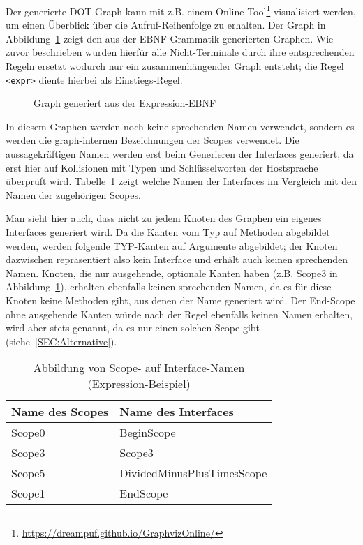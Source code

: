 \documentclass[../InterneDSLs.tex]{subfiles}
\begin{document}
Der generierte DOT-Graph kann mit z.B. einem Online-Tool\footnote{\url{https://dreampuf.github.io/GraphvizOnline/}} visualisiert werden, um einen Überblick über die Aufruf-Reihenfolge zu erhalten. Der Graph in Abbildung~\ref{FIG:ExprGraph} zeigt den aus der EBNF-Grammatik generierten Graphen. Wie zuvor beschrieben wurden hierfür alle Nicht-Terminale durch ihre entsprechenden Regeln ersetzt wodurch nur ein zusammenhängender Graph entsteht; die Regel \verb|<expr>| diente hierbei als Einstiegs-Regel.

\begin{figure}[ht]
\centering
\resizebox{\linewidth}{!}{}
\caption{Graph generiert aus der Expression-EBNF}
\label{FIG:ExprGraph}
\end{figure}

In diesem Graphen werden noch keine sprechenden Namen verwendet, sondern es werden die graph-internen Bezeichnungen der Scopes verwendet. Die aussagekräftigen Namen werden erst beim Generieren der Interfaces generiert, da erst hier auf Kollisionen mit Typen und Schlüsselworten der Hostsprache überprüft wird. Tabelle~\ref{TAB:MappingExpressionScopeToInterface} zeigt welche Namen der Interfaces im Vergleich mit den Namen der zugehörigen Scopes.

Man sieht hier auch, dass nicht zu jedem Knoten des Graphen ein eigenes Interfaces generiert wird. Da die Kanten vom Typ  auf Methoden abgebildet werden, werden folgende TYP-Kanten auf Argumente abgebildet; der Knoten dazwischen repräsentiert also kein Interface und erhält auch keinen sprechenden Namen. Knoten, die nur ausgehende, optionale Kanten haben (z.B. Scope3 in Abbildung~\ref{FIG:ExprGraph}), erhalten ebenfalls keinen sprechenden Namen, da es für diese Knoten keine Methoden gibt, aus denen der Name generiert wird. Der End-Scope ohne ausgehende Kanten würde nach der Regel ebenfalls keinen Namen erhalten, wird aber stets  genannt, da es nur einen solchen Scope gibt (siehe~\ref{SEC:Alternative}).

\begin{table}[ht]
\centering
\begin{tabular}{ll}
\textbf{Name des Scopes} & \textbf{Name des Interfaces}\\\hline
Scope0 & BeginScope\\
Scope3 & Scope3\\
Scope5 & DividedMinusPlusTimesScope\\
Scope1 & EndScope\\
\end{tabular}
\caption[Abbildung von Scope- auf Interfacenamen (Expression-Beispiel)]{Abbildung von Scope- auf Interface-Namen (Expression-Beispiel)}
\label{TAB:MappingExpressionScopeToInterface}
\end{table}
\end{document}
